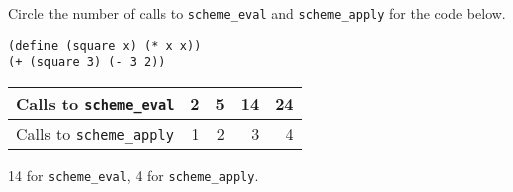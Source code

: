 \begin{blocksection}
\question Circle the number of calls to \lstinline$scheme_eval$ and
\lstinline$scheme_apply$ for the code below.

\begin{lstlisting}
(define (square x) (* x x))
(+ (square 3) (- 3 2))
\end{lstlisting}

\begin{tabular}{l|rrrr}
Calls to \lstinline$scheme_eval$ & 2 & 5 & 14 & 24 \\
\hline
Calls to \lstinline$scheme_apply$ & 1 & 2 & 3 & 4
\end{tabular}

\begin{solution}
14 for \lstinline$scheme_eval$, 4 for \lstinline$scheme_apply$.
\end{solution}
\end{blocksection}
